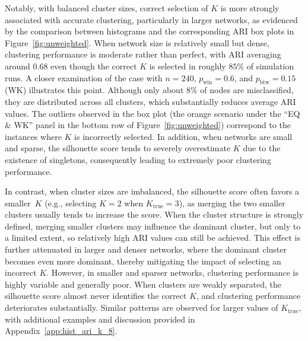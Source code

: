 \documentclass[12pt, titlepage, reqno]{article}
\begin{document}
Notably, with balanced cluster sizes, correct selection of $K$ is 
more strongly associated with accurate clustering, particularly in 
larger networks, as evidenced by the comparison between histograms 
and the corresponding ARI box plots in Figure~\ref{fig:unweighted}. 
When network size is relatively small but 
dense, clustering performance is moderate rather than perfect, with 
ARI averaging around $0.68$ even though the correct $K$ is selected 
in roughly $85\%$ of simulation runs. A closer examination of the 
case with $n = 240$, $p_{\text{win}} = 0.6$, and $p_{\text{btw}} = 
0.15$ (WK) illustrates this point. Although only about $8\%$ of nodes 
are misclassified, they are distributed across all clusters, which 
substantially reduces average ARI values. The outliers observed in 
the box plot (the orange scenario under the ``EQ \& WK'' panel in the 
bottom row of Figure~\ref{fig:unweighted}) correspond 
to the instances where $K$ is incorrectly selected. In addition, 
when networks are small and sparse, the silhouette score tends to 
severely overestimate $K$ due to the existence of singletons, 
consequently leading to extremely poor clustering performance.


In contrast, when cluster sizes are imbalanced, the silhouette score 
often favors a smaller~$K$ (e.g., selecting $K = 2$ when 
$K_{\text{true}} = 3$), as merging the 
two smaller clusters usually tends to increase the score. When the 
cluster structure is strongly defined, merging smaller clusters may 
influence the dominant cluster, but only to a limited extent, so 
relatively high ARI values can still be achieved. This effect is 
further attenuated in larger and denser networks, where the dominant 
cluster becomes even more dominant, thereby mitigating the impact of 
selecting an incorrect $K$. However, in smaller and sparser networks, 
clustering performance is highly variable and generally poor. When 
clusters are weakly separated, the silhouette score almost never 
identifies the correct $K$, and clustering performance deteriorates 
substantially. Similar patterns are observed for larger values of 
$K_{\text{true}}$, with additional examples and discussion provided 
in Appendix~\ref{app:hist_ari_k_8}.


\end{document}
